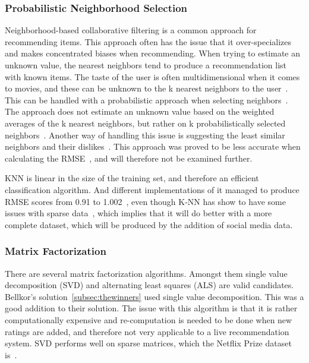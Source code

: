 \subsubsection{Probabilistic Neighborhood Selection}
Neighborhood-based collaborative filtering is a common approach for recommending items. This approach often has the issue that it over-specializes and makes concentrated biases when recommending. When trying to estimate an unknown value, the nearest neighbors tend to produce a recommendation list with known items. The taste of the user is often multidimensional when it comes to movies, and these can be unknown to the k nearest neighbors to the user~\cite{umana}. This can be handled with a probabilistic approach when selecting neighbors~\cite{probcobfilter}. The approach does not estimate an unknown value based on the weighted averages of the k nearest neighbors, but rather on k probabilistically selected neighbors~\cite{optaplanner}. Another way of handling this issue is suggesting the least similar neighbors and their dislikes~\cite{furthestneighbor}. This approach was proved to be less accurate when calculating the RMSE~\cite{probcobfilter}, and will therefore not be examined further.

KNN is linear in the size of the training set, and therefore an efficient classification algorithm\cite{introtoIR}. And different implementations of it managed to produce RMSE scores from 0.91 to 1.002~\cite{knnnetflixstand, knnoldies, knnimpl, knncolbgroup}, even though K-NN has show to have some issues with sparse data~\cite{grobelnikDataSparsityIssues}, which implies that it will do better with a more complete dataset, which will be produced by the addition of social media data.


\subsubsection{Matrix Factorization}\label{subsubsec:matrixfac}
There are several matrix factorization algorithms. Amongst them single value decomposition (SVD) and alternating least squares (ALS) are valid candidates. Bellkor's solution~\ref{subsec:thewinners} used single value decomposition. This was a good addition to their solution. The issue with this algorithm is that it is rather computationally expensive and re-computation is needed to be done when new ratings are added, and therefore not very applicable to a live recommendation system. SVD performs well on sparse matrices, which the Netflix Prize dataset is~\cite{grobelnikDataSparsityIssues}.

